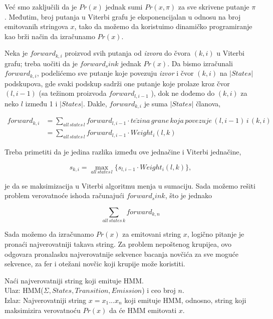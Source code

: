 Već smo zaključili da je $ Pr(x) $ jednak sumi $ Pr(x, \pi) $ za sve skrivene putanje $ \pi $. Međutim, broj putanja u Viterbi grafu je eksponencijalan u odnosu na broj emitovanih stringova $ x $, tako da možemo da koristuimo dinamičko programiranje kao brži način da izračunamo $ Pr(x) $.

Neka je $ forward_{k, i} $ proizvod svih putanja od \textit{izvora} do čvora $ (k, i) $ u Viterbi grafu; treba uočiti da je $ forward_sink $ jednak $ Pr(x) $. Da bismo izračunali $ forward_{k, i} $, podelićemo sve putanje koje povezuju \textit{izvor} i čvor $ (k, i) $ na $ |States| $ podskupova, gde svaki podskup sadrži one putanje koje prolaze kroz čvor $ (l, i-1) $ (sa težinom proizvoda  $ forward_{l, i-1} $ ), dok ne dođemo do $ (k, i) $ za neko $ l $ između 1 i $ |States| $. Dakle, $ forward_{k, i} $ je suma $ |States| $ članova, 

\begin{equation}
\begin{aligned}
    forward_{k, i} & = {\displaystyle \sum_{all\,states\,l} forward_{l, i-1} \cdot te\check{z}ina\,grane\,koja\,povezuje\,(l, i-1)\,i\,(k, i)} \\
    &= {\displaystyle \sum_{all\,states\,l} forward_{l, i-1} \cdot Weight_i(l, k)}
\end{aligned}    
\end{equation}




Treba primetiti da je jedina razlika između ove jednačine i Viterbi jednačine,

\begin{equation}
    s_{k, i} =  {\displaystyle \max_{all\,states\,l} \{s_{l, i-1} \cdot Weight_i(l, k)\}}, 
\end{equation}

je da se maksimizacija u Viterbi algoritmu menja u sumaciju. Sada možemo rešiti problem verovatnoće ishoda računajući $ forward_sink $, što je jednako

\begin{equation}
    {\displaystyle \sum_{all\,states\,k} forward_{k, n}}
\end{equation}

Sada možemo da izračunamo $ Pr(x) $ za emitovani string $ x $, logično pitanje je pronaći najverovatniji takava string. Za problem nepoštenog krupijea, ovo odgovara pronalasku najverovatnije sekvence bacanja novčića za sve moguće sekvence, za fer i otežani novčic koji krupije može koristiti.

\begin{problem}
    Naći najverovatniji string koji emituje HMM. \\
    Ulaz: HMM($ \Sigma, States, Transition, Emission $) i ceo broj $ n $.\\
    Izlaz: Najverovatniji string $ x = x_1...x_n $ koji emituje HMM, odnosno, string koji maksimizira verovatnoću $ Pr(x) $ da će HMM emitovati $ x $.
    
\end{problem}

